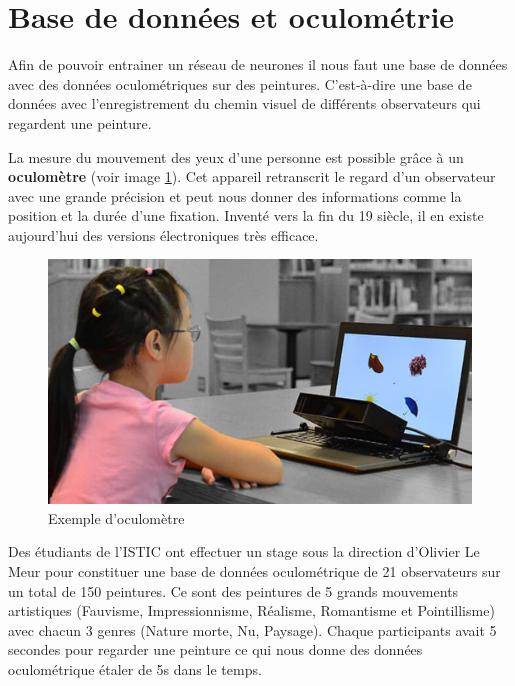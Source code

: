 \section{Base de données et oculométrie}
\par
Afin de pouvoir entrainer un réseau de neurones il nous faut une base de données avec des données oculométriques sur des peintures. C'est-à-dire une base de données avec l'enregistrement du chemin visuel de différents observateurs qui regardent une peinture.

\par
La mesure du mouvement des yeux d'une personne est possible grâce à un \textbf{oculomètre} (voir image \ref{oculo}). Cet appareil retranscrit le regard d'un observateur avec une grande précision et peut nous donner des informations comme la position et la durée d'une fixation. Inventé vers la fin du 19 siècle, il en existe aujourd'hui des versions électroniques très efficace.

\begin{figure}[!ht]
    \centering
    \includegraphics[width=0.7\linewidth]{datas/oculometre.jpg}
    \caption{Exemple d'oculomètre}
    \label{oculo}
\end{figure}

Des étudiants de l'ISTIC ont effectuer un stage sous la direction d'Olivier Le Meur pour constituer une base de données oculométrique de 21 observateurs sur un total de 150 peintures. Ce sont des peintures de 5 grands mouvements artistiques (Fauvisme, Impressionnisme, Réalisme, Romantisme et Pointillisme) avec chacun 3 genres (Nature morte, Nu, Paysage). Chaque participants avait 5 secondes pour regarder une peinture ce qui nous donne des données oculométrique étaler de 5s dans le temps.